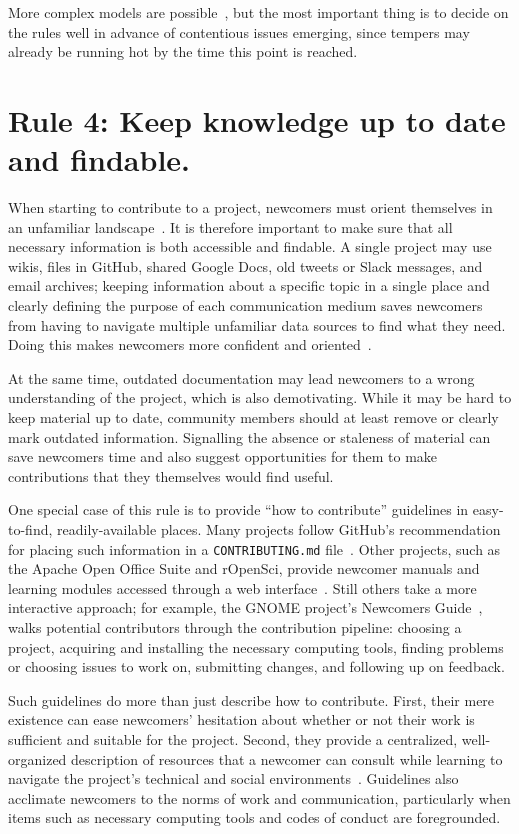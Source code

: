\documentclass[10pt,letterpaper]{article}
\newcommand{\rulemajor}[1]{\section*{#1}}
\begin{document}
More complex models are possible~\cite{apache-governance},
but the most important thing is to decide on the rules well in advance of contentious issues emerging,
since tempers may already be running hot by the time this point is reached.

\rulemajor{Rule 4: Keep knowledge up to date and findable.}

When starting to contribute to a project,
newcomers must orient themselves in an unfamiliar landscape~\cite{dagenais2010}.
It is therefore important to make sure that all necessary information is both accessible and findable.
A single project may use wikis, files in GitHub, shared Google Docs, old tweets or Slack messages, and email archives;
keeping information about a specific topic in a single place
and clearly defining the purpose of each communication medium
saves newcomers from having to navigate multiple unfamiliar data sources to find what they need.
Doing this makes newcomers more confident and oriented~\cite{steinmacher2016}.

At the same time,
outdated documentation may lead newcomers to a wrong understanding of the project,
which is also demotivating.
While it may be hard to keep material up to date,
community members should at least remove or clearly mark outdated information.
Signalling the absence or staleness of material can save newcomers time
and also suggest opportunities for them to make contributions that they themselves would find useful.

One special case of this rule is to provide ``how to contribute'' guidelines in easy-to-find, readily-available places.
Many projects follow GitHub's recommendation for placing such information in a \texttt{CONTRIBUTING.md} file~\cite{github-rec}.
Other projects,
such as the Apache Open Office Suite and rOpenSci,
provide newcomer manuals and learning modules accessed through a web interface~\cite{apache-guidelines,ropensci-guidelines}.
Still others take a more interactive approach;
for example,
the GNOME project's Newcomers Guide~\cite{gnome-newcomers}, walks potential contributors through the contribution pipeline:
choosing a project,
acquiring and installing the necessary computing tools,
finding problems or choosing issues to work on,
submitting changes,
and following up on feedback.

Such guidelines do more than just describe how to contribute.
First,
their mere existence can ease newcomers' hesitation
about whether or not their work is sufficient and suitable for the project.
Second,
they provide a centralized, well-organized description of resources
that a newcomer can consult while learning to navigate the project's technical and social environments~\cite{zanatta2017}.
Guidelines also acclimate newcomers to the norms of work and communication,
particularly when items such as necessary computing tools and codes of conduct are foregrounded.
\end{document}
